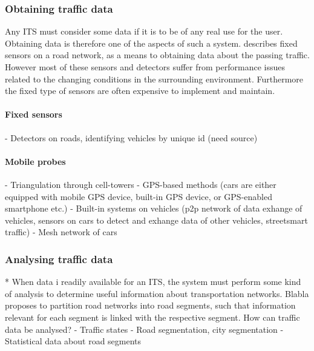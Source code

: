 \subsubsection*{Obtaining traffic data}
Any ITS must consider some data if it is to be of any real use for the user. Obtaining data is therefore one of the aspects of such a system. \cite{KamranHaas2007} describes fixed sensors on a road network, as a means to obtaining data about the passing traffic. However most of these sensors and detectors suffer from performance issues related to the changing conditions in the surrounding environment. Furthermore the fixed type of sensors are often expensive to implement and maintain\cite{KamranHaas2007}. %

\paragraph{Fixed sensors}
- Detectors on roads, identifying vehicles by unique id (need source)


\paragraph{Mobile probes}
- Triangulation through cell-towers
- GPS-based methods (cars are either equipped with mobile GPS device, built-in GPS device, or GPS-enabled smartphone etc.) 
- Built-in systems on vehicles (p2p network of data exhange of vehicles, sensors on cars to detect and exhange data of other vehicles, streetsmart traffic)
- Mesh network of cars

\subsubsection*{Analysing traffic data}*
When data i readily available for an ITS, the system must perform some kind of analysis to determine useful information about transportation networks. Blabla proposes to partition road networks into road segments, such that information relevant for each segment is linked with the respective segment. 
How can traffic data be analysed?
- Traffic states
- Road segmentation, city segmentation
- Statistical data about road segments 